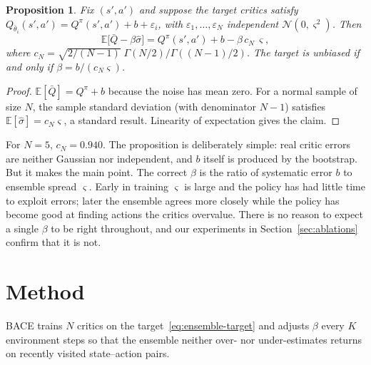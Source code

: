 \documentclass[10pt,twocolumn,letterpaper]{article}
\newtheorem{proposition}{Proposition}
\newcommand{\E}{\mathbb{E}}
\newcommand{\Qbar}{\bar{Q}}
\newcommand{\method}{\textsc{BACE}}
\begin{document}
\begin{proposition}\label{prop:bias}
Fix $(s',a')$ and suppose the target critics satisfy $Q_{\bar\theta_i}(s',a') = Q^\pi(s',a') + b + \varepsilon_i$, with $\varepsilon_1,\dots,\varepsilon_N$ independent $\mathcal{N}(0,\varsigma^2)$. Then
\begin{equation}
  \E\bigl[\Qbar - \beta\hat\sigma\bigr] = Q^\pi(s',a') + b - \beta\,c_N\,\varsigma,
\end{equation}
where $c_N = \sqrt{2/(N-1)}\;\Gamma(N/2)/\Gamma((N-1)/2)$. The target is unbiased if and only if $\beta = b/(c_N\varsigma)$.
\end{proposition}

\begin{proof}
$\E[\Qbar] = Q^\pi + b$ because the noise has mean zero. For a normal sample of size $N$, the sample standard deviation (with denominator $N-1$) satisfies $\E[\hat\sigma] = c_N\varsigma$, a standard result. Linearity of expectation gives the claim.
\end{proof}

For $N = 5$, $c_N = 0.940$. The proposition is deliberately simple: real critic errors are neither Gaussian nor independent, and $b$ itself is produced by the bootstrap. But it makes the main point. The correct $\beta$ is the ratio of systematic error $b$ to ensemble spread $\varsigma$. Early in training $\varsigma$ is large and the policy has had little time to exploit errors; later the ensemble agrees more closely while the policy has become good at finding actions the critics overvalue. There is no reason to expect a single $\beta$ to be right throughout, and our experiments in Section~\ref{sec:ablations} confirm that it is not.

\section{Method}
\label{sec:method}

\method{} trains $N$ critics on the target~\eqref{eq:ensemble-target} and adjusts $\beta$ every $K$ environment steps so that the ensemble neither over- nor under-estimates returns on recently visited state--action pairs.
\end{document}
